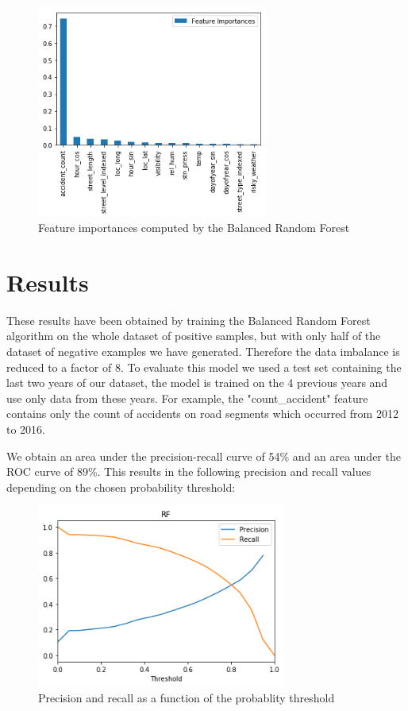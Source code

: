 \documentclass[conference]{IEEEtran}
\begin{document}
\begin{figure}[htbp]
\centerline{\includegraphics[height=7cm, keepaspectratio]{figures/feature_importances.png}}
\caption{Feature importances computed by the Balanced Random Forest}
\label{fig}
\end{figure}

\section{Results}
These results have been obtained by training the Balanced Random Forest algorithm on the whole dataset of positive samples, but with only half of the dataset of negative examples we have generated. Therefore the data imbalance is reduced to a factor of 8. To evaluate this model we used a test set containing the last two years of our dataset, the model is trained on the 4 previous years and use only data from these years. For example, the "count\_accident" feature contains only the count of accidents on road segments which occurred from 2012 to 2016.

We obtain an area under the precision-recall curve of 54\% and an area under the ROC curve of 89\%.
This results in the following precision and recall values depending on the chosen probability threshold:

\begin{figure}[htbp]
\centerline{\includegraphics[height=6cm, keepaspectratio]{figures/pr.png}}
\caption{Precision and recall as a function of the probablity threshold}
\label{fig}
\end{figure}
\end{document}
